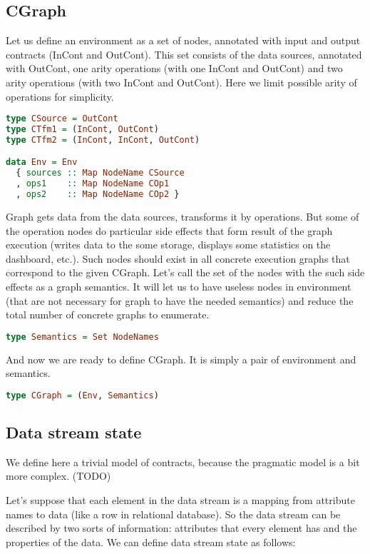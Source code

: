 \subsection{CGraph}

Let us define an environment as a set of nodes, annotated with input and output contracts (InCont and OutCont).
This set consists of the data sources, annotated with OutCont, one arity operations (with one InCont and OutCont) and two arity operations (with two InCont and OutCont).
Here we limit possible arity of operations for simplicity.

\begin{lstlisting}[language=Haskell]
type CSource = OutCont
type CTfm1 = (InCont, OutCont)
type CTfm2 = (InCont, InCont, OutCont)

data Env = Env
  { sources :: Map NodeName CSource
  , ops1    :: Map NodeName COp1
  , ops2    :: Map NodeName COp2 }
\end{lstlisting}

Graph gets data from the data sources, transforms it by operations.
But some of the operation nodes do particular side effects that form result of the graph execution (writes data to the some storage, displays some statistics on the dashboard, etc.).
Such nodes should exist in all concrete execution graphs that correspond to the given CGraph.
Let's call the set of the nodes with the such side effects as a graph semantics.
It will let us to have useless nodes in environment (that are not necessary for graph to have the needed semantics) and reduce the total number of concrete graphs to enumerate.

\begin{lstlisting}[language=Haskell]
type Semantics = Set NodeNames
\end{lstlisting}

And now we are ready to define CGraph.
It is simply a pair of environment and semantics.

\begin{lstlisting}[language=Haskell]
type CGraph = (Env, Semantics)
\end{lstlisting}

\subsection{Data stream state}

We define here a trivial model of contracts, because the pragmatic model is a bit more complex. (TODO)

Let's suppose that each element in the data stream is a mapping from attribute names to data (like a row in relational database).
So the data stream can be described by two sorts of information: attributes that every element has and the properties of the data.
We can define data stream state as follows:

